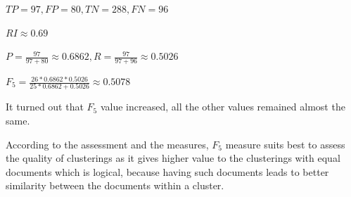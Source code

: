 \documentclass[a4paper, notitlepage]{article}
\begin{document}
\(TP = 97, FP = 80, TN = 288, FN = 96\) \newline

\(RI \approx 0.69 \) \newline

\(P = \frac{97}{97 + 80} \approx 0.6862, R = \frac{97}{97 + 96} \approx 0.5026\) \newline

\(F_{5} = \frac{26 * 0.6862 * 0.5026}{25*0.6862 + 0.5026} \approx 0.5078\) \newline

It turned out that $F_{5}$ value increased, all the other values remained almost the same.

According to the assessment and the measures, $F_5$ measure suits best to assess the quality of clusterings as it gives higher value to the clusterings with equal documents which is logical, because having such documents leads to better similarity between the documents within a cluster.
\end{document}
